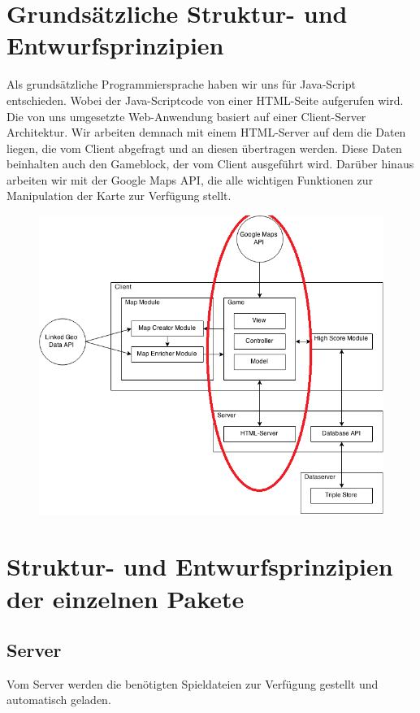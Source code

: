 \documentclass[11pt,a4paper]{article}
\begin{document}
\section{Grundsätzliche Struktur- und Entwurfsprinzipien}
Als grundsätzliche Programmiersprache haben wir uns für Java-Script entschieden. Wobei der Java-Scriptcode von einer HTML-Seite aufgerufen wird.\\
Die von uns umgesetzte Web-Anwendung basiert auf einer Client-Server Architektur. Wir arbeiten demnach mit einem HTML-Server auf dem die Daten liegen, die vom Client abgefragt und an diesen übertragen werden. Diese Daten beinhalten auch den Gameblock, der vom Client ausgeführt wird. Darüber hinaus arbeiten wir mit der Google Maps API, die alle wichtigen Funktionen zur Manipulation der Karte zur Verfügung stellt.\\
\begin{figure}[htb]
  \centering
  \includegraphics[scale=0.4]{arch.png}
  \label{PNFs}
\end{figure} 



\section{Struktur- und Entwurfsprinzipien der einzelnen Pakete}
\subsection{Server} Vom Server werden die benötigten Spieldateien zur Verfügung gestellt und automatisch geladen.
\end{document}
